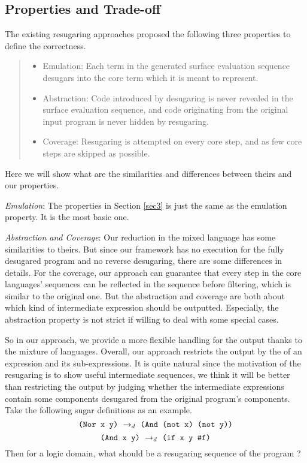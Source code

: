 \subsection{Properties and Trade-off}
\label{mark:correctness}

\todo{}

The existing resugaring approaches \cite{resugaring,hygienic} proposed the following three properties to define the correctness.

\begin{quote}
\begin{itemize}
    \item Emulation:
Each term in the generated surface evaluation sequence desugars into the core term which it is meant to represent.
    \item Abstraction:
Code introduced by desugaring is never revealed in the surface evaluation sequence, and code originating from the original input program is never hidden by resugaring.
    \item Coverage: Resugaring is attempted on every core step, and as few core steps are skipped as possible.
\end{itemize}
\end{quote}
Here we will show what are the similarities and differences between theirs and our properties.

\emph{Emulation}: The properties in Section \ref{sec3} is just the same as the emulation property. It is the most basic one.

\emph{Abstraction and Coverage}: Our reduction in the mixed language has some similarities to theirs. But since our framework has no execution for the fully desugared program and no reverse desugaring, there are some differences in details. For the coverage, our approach can guarantee that every step in the core languages' sequences can be reflected in the sequence before filtering, which is similar to the original one. But the abstraction and coverage are both about which kind of intermediate expression should be outputted. Especially, the abstraction property is not strict if willing to deal with some special cases.

So in our approach, we provide a more flexible handling for the output thanks to the mixture of languages. Overall, our approach restricts the output by the  of an expression and its sub-expressions. It is quite natural since the motivation of the resugaring is to show useful intermediate sequences, we think it will be better than restricting the output by judging whether the intermediate expressions contain some components desugared from the original program's components. Take the following sugar definitions as an example.
\[
\texttt{(Nor~x~y)} ~\rightarrow_d~ \texttt{(And~(not~x)~(not~y))}
\]
\[
\texttt{(And~x~y)} ~\rightarrow_d~ \texttt{(if~x~y~\#f)}
\]
Then for a logic domain, what should be a resugaring sequence of the program  ?

